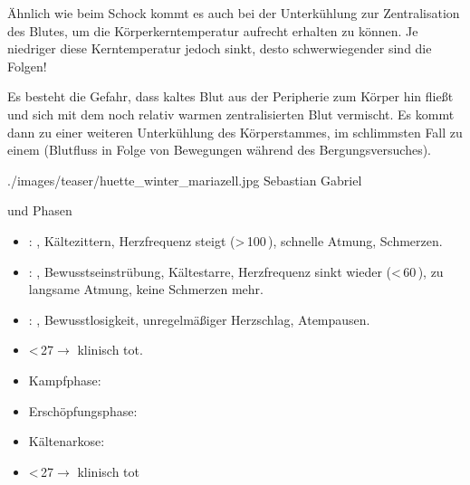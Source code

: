 \TextSlideTeaser
{\TxBeschreibung}%
{%
Ähnlich
wie beim Schock kommt es auch  bei der Unterkühlung zur
Zentralisation  des Blutes, um die  Körperkerntemperatur
aufrecht erhalten  zu können. Je niedriger diese 
Kerntemperatur jedoch sinkt, desto  schwerwiegender sind die
Folgen!

Es besteht die Gefahr, dass kaltes Blut aus der Peripherie
zum Körper hin fließt und sich mit dem noch relativ warmen
zentralisierten Blut vermischt. Es kommt dann zu einer
weiteren Unterkühlung des Körperstammes, im schlimmsten Fall
zu
einem  (Blutfluss in Folge von Bewegungen während des
Bergungsversuches).}%
{}%
{./images/teaser/huette_winter_mariazell.jpg}%
{}%
{}%
{Sebastian Gabriel}%
{}%

\TextSlide
{{\TxSymptome} und Phasen}
{

\begin{itemize}
  \item {}: 
  \DegC*, Kältezittern,
  Herzfrequenz steigt ({\textgreater}\,100\,), schnelle Atmung, Schmerzen. 
  \item {}:
  \DegC*, Bewusstseinstrübung,
  Kältestarre, Herzfrequenz sinkt wieder ({\textless}\,60\,), zu langsame Atmung,
  keine Schmerzen mehr. 
  \item {}:
  \DegC*, Bewusstlosigkeit,
  unregelmäßiger Herzschlag, Atempausen.
  \item {\textless}\,27\DegC* ${\rightarrow}$ klinisch tot. 
\end{itemize}}
{%
\begin{itemize}
  \item {Kampfphase}: 
  \DegC*
  \item {Erschöpfungsphase}:
  \DegC*
  \item {Kältenarkose}:
  \DegC*
  \item {\textless}\,27\DegC* ${\rightarrow}$ klinisch tot
\end{itemize}
}
{}
{}
{}

\begin{Synopsis}
\end{Synopsis}






\ChapterEnd